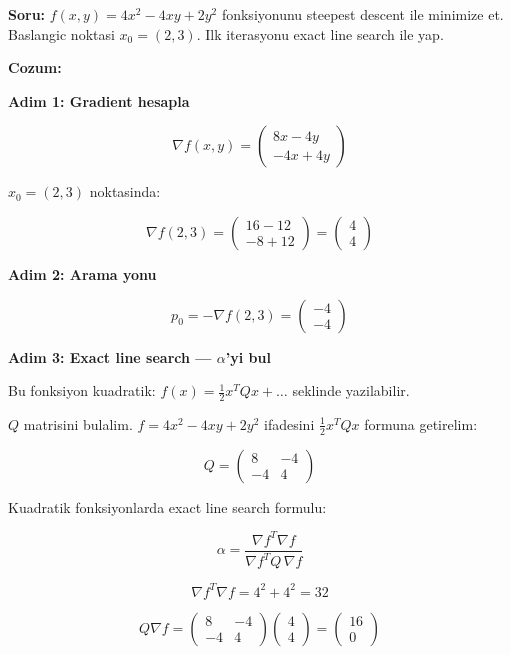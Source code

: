 \documentclass[12pt,a4paper]{article}
\theoremstyle{definition}
\theoremstyle{remark}
\begin{document}
\textbf{Soru:} $f(x,y) = 4x^2 - 4xy + 2y^2$ fonksiyonunu steepest descent ile minimize et. Baslangic noktasi $x_0 = (2, 3)$. Ilk iterasyonu exact line search ile yap.

\bigskip
\textbf{Cozum:}

\textbf{Adim 1: Gradient hesapla}

\[
\nabla f(x,y) = \begin{pmatrix} 8x - 4y \\ -4x + 4y \end{pmatrix}
\]

$x_0 = (2, 3)$ noktasinda:

\[
\nabla f(2,3) = \begin{pmatrix} 16 - 12 \\ -8 + 12 \end{pmatrix} = \begin{pmatrix} 4 \\ 4 \end{pmatrix}
\]

\textbf{Adim 2: Arama yonu}

\[
p_0 = -\nabla f(2,3) = \begin{pmatrix} -4 \\ -4 \end{pmatrix}
\]

\textbf{Adim 3: Exact line search --- $\alpha$'yi bul}

Bu fonksiyon kuadratik: $f(x) = \frac{1}{2}x^T Q x + \ldots$ seklinde yazilabilir.

$Q$ matrisini bulalim. $f = 4x^2 - 4xy + 2y^2$ ifadesini $\frac{1}{2}x^T Q x$ formuna getirelim:

\[
Q = \begin{pmatrix} 8 & -4 \\ -4 & 4 \end{pmatrix}
\]

Kuadratik fonksiyonlarda exact line search formulu:

\[
\alpha = \frac{\nabla f^T \nabla f}{\nabla f^T Q \, \nabla f}
\]

\[
\nabla f^T \nabla f = 4^2 + 4^2 = 32
\]

\[
Q \nabla f = \begin{pmatrix} 8 & -4 \\ -4 & 4 \end{pmatrix} \begin{pmatrix} 4 \\ 4 \end{pmatrix} = \begin{pmatrix} 16 \\ 0 \end{pmatrix}
\]
\end{document}
